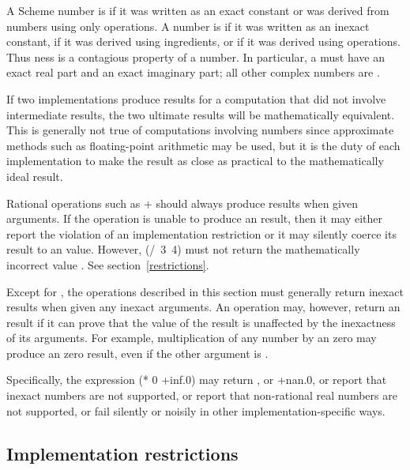 A Scheme number is
 if it was written as an exact constant or was derived from
 numbers using only  operations.  A number is
 if it was written as an inexact constant,
if it was
derived using  ingredients, or if it was derived using
 operations. Thus ness is a contagious
property of a number.
In particular, a  must have an exact real part
and an exact imaginary part; all other complex numbers are .

\vest If two implementations produce  results for a
computation that did not involve  intermediate results,
the two ultimate results will be mathematically equivalent.  This is
generally not true of computations involving  numbers
since approximate methods such as floating-point arithmetic may be used,
but it is the duty of each implementation to make the result as close as
practical to the mathematically ideal result.

\vest Rational operations such as {\cf +} should always produce
 results when given  arguments.
If the operation is unable to produce an  result,
then it may either report the violation of an implementation restriction
or it may silently coerce its
result to an  value.
However, {\cf (/~3~4)} must not return the mathematically incorrect value {}.
See section~\ref{restrictions}.

\vest Except for , the operations described in
this section must generally return inexact results when given any inexact
arguments.  An operation may, however, return an  result if it can
prove that the value of the result is unaffected by the inexactness of its
arguments.  For example, multiplication of any number by an  zero
may produce an  zero result, even if the other argument is
.

Specifically, the expression {\cf (* 0 +inf.0)} may return {},
or {\cf +nan.0}, or report that inexact numbers are not supported,
or report that non-rational real numbers are not supported, or fail
silently or noisily in other implementation-specific ways.

\subsection{Implementation restrictions}

